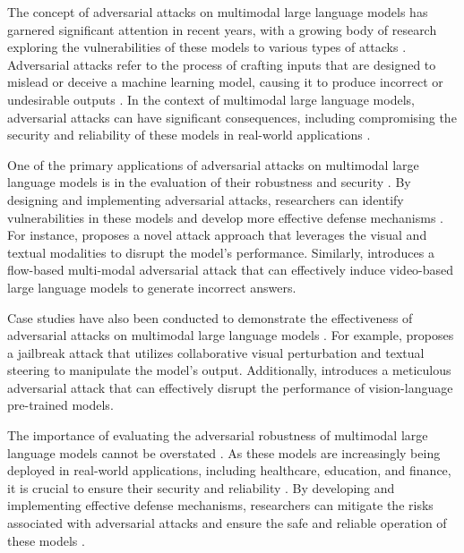 \documentclass[11pt,a4paper]{article}
\begin{document}
The concept of adversarial attacks on multimodal large language models has garnered significant attention in recent years, with a growing body of research exploring the vulnerabilities of these models to various types of attacks \cite{doi:10.1109/iccvw60793.2023.00395}. Adversarial attacks refer to the process of crafting inputs that are designed to mislead or deceive a machine learning model, causing it to produce incorrect or undesirable outputs \cite{doi:10.53941/tai.2025.100003}. In the context of multimodal large language models, adversarial attacks can have significant consequences, including compromising the security and reliability of these models in real-world applications \cite{arxiv:2402.00891}.

One of the primary applications of adversarial attacks on multimodal large language models is in the evaluation of their robustness and security \cite{arxiv:2408.08632}. By designing and implementing adversarial attacks, researchers can identify vulnerabilities in these models and develop more effective defense mechanisms \cite{arxiv:2402.02309}. For instance, \cite{arxiv:2305.16934} proposes a novel attack approach that leverages the visual and textual modalities to disrupt the model's performance. Similarly, \cite{arxiv:2403.13507} introduces a flow-based multi-modal adversarial attack that can effectively induce video-based large language models to generate incorrect answers.

Case studies have also been conducted to demonstrate the effectiveness of adversarial attacks on multimodal large language models \cite{doi:10.1609/aaai.v39i4.32396}. For example, \cite{doi:10.1145/3746027.3754561} proposes a jailbreak attack that utilizes collaborative visual perturbation and textual steering to manipulate the model's output. Additionally, \cite{arxiv:2502.08079} introduces a meticulous adversarial attack that can effectively disrupt the performance of vision-language pre-trained models.

The importance of evaluating the adversarial robustness of multimodal large language models cannot be overstated \cite{arxiv:2405.02764}. As these models are increasingly being deployed in real-world applications, including healthcare, education, and finance, it is crucial to ensure their security and reliability \cite{doi:10.1145/3764113}. By developing and implementing effective defense mechanisms, researchers can mitigate the risks associated with adversarial attacks and ensure the safe and reliable operation of these models \cite{arxiv:2502.01576}.
\end{document}
